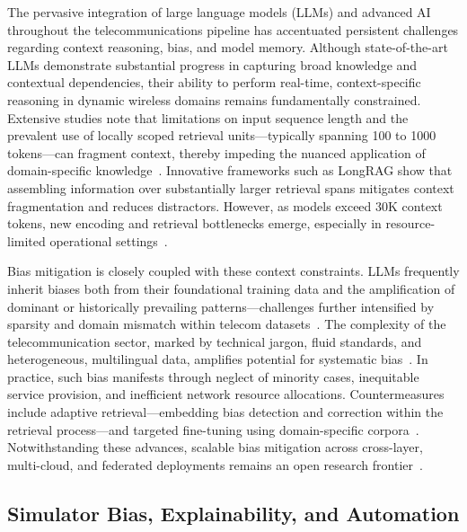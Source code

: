 \documentclass[sigconf]{acmart}
\begin{document}
The pervasive integration of large language models (LLMs) and advanced AI throughout the telecommunications pipeline has accentuated persistent challenges regarding context reasoning, bias, and model memory. Although state-of-the-art LLMs demonstrate substantial progress in capturing broad knowledge and contextual dependencies, their ability to perform real-time, context-specific reasoning in dynamic wireless domains remains fundamentally constrained. Extensive studies note that limitations on input sequence length and the prevalent use of locally scoped retrieval units—typically spanning 100 to 1000 tokens—can fragment context, thereby impeding the nuanced application of domain-specific knowledge~\cite{ref7,ref9,ref16,ref20,ref21,ref22,ref28,ref37}. Innovative frameworks such as LongRAG show that assembling information over substantially larger retrieval spans mitigates context fragmentation and reduces distractors. However, as models exceed 30K context tokens, new encoding and retrieval bottlenecks emerge, especially in resource-limited operational settings~\cite{ref37}.

Bias mitigation is closely coupled with these context constraints. LLMs frequently inherit biases both from their foundational training data and the amplification of dominant or historically prevailing patterns—challenges further intensified by sparsity and domain mismatch within telecom datasets~\cite{ref7,ref9,ref21}. The complexity of the telecommunication sector, marked by technical jargon, fluid standards, and heterogeneous, multilingual data, amplifies potential for systematic bias~\cite{ref7,ref22,ref26}. In practice, such bias manifests through neglect of minority cases, inequitable service provision, and inefficient network resource allocations. Countermeasures include adaptive retrieval—embedding bias detection and correction within the retrieval process—and targeted fine-tuning using domain-specific corpora~\cite{ref20,ref28}. Notwithstanding these advances, scalable bias mitigation across cross-layer, multi-cloud, and federated deployments remains an open research frontier~\cite{ref16,ref26,ref37}.

\subsection{Simulator Bias, Explainability, and Automation}
\end{document}

